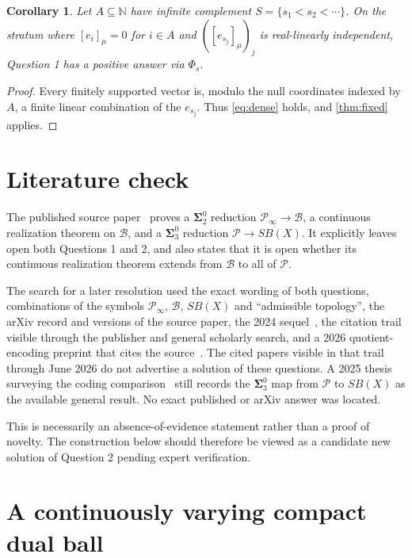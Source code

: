 \documentclass[11pt]{article}
\newtheorem{corollary}[theorem]{Corollary}
\theoremstyle{definition}
\newcommand{\Pcal}{\mathcal P}
\newcommand{\Bcal}{\mathcal B}
\newcommand{\N}{\mathbb N}
\newcommand{\SigmaTwo}{\boldsymbol{\Sigma}^{0}_{2}}
\begin{document}
\begin{corollary}\label{cor:fixed-zero}
Let $A\subseteq\N$ have infinite complement
$S=\{s_1<s_2<\cdots\}$.  On the stratum where $[e_i]_\mu=0$ for $i\in A$ and
$([e_{s_j}]_\mu)_j$ is real-linearly independent, Question 1 has a positive
answer via $\Phi_s$.
\end{corollary}

\begin{proof}
Every finitely supported vector is, modulo the null coordinates indexed by $A$,
a finite linear combination of the $e_{s_j}$.  Thus \eqref{eq:dense} holds, and
\cref{thm:fixed} applies.
\end{proof}

\section{Literature check}\label{sec:literature}

The published source paper~\cite{CDDK} proves a $\SigmaTwo$ reduction
$\Pcal_\infty\to\Bcal$, a continuous realization theorem on $\Bcal$, and a
$\boldsymbol\Sigma^0_3$ reduction $\Pcal\to SB(X)$.  It explicitly leaves open
both Questions 1 and 2, and also states that it is open whether its continuous
realization theorem extends from $\Bcal$ to all of $\Pcal$.

The search for a later resolution used the exact wording of both questions,
combinations of the symbols $\Pcal_\infty$, $\Bcal$, $SB(X)$ and
``admissible topology'', the arXiv record and versions of the source paper, the
2024 sequel~\cite{CDDK2}, the citation trail visible through the publisher and
general scholarly search, and a 2026 quotient-encoding preprint that cites the
source~\cite{Kania}.  The cited papers visible in that trail through June 2026
do not advertise a solution of these questions.  A 2025 thesis surveying the
coding comparison~\cite{Kaplan} still records the
$\boldsymbol\Sigma^0_3$ map from $\Pcal$ to $SB(X)$ as the available general
result.  No exact published or arXiv answer was located.

This is necessarily an absence-of-evidence statement rather than a proof of
novelty.  The construction below should therefore be viewed as a candidate new
solution of Question 2 pending expert verification.

\section{A continuously varying compact dual ball}
\end{document}
